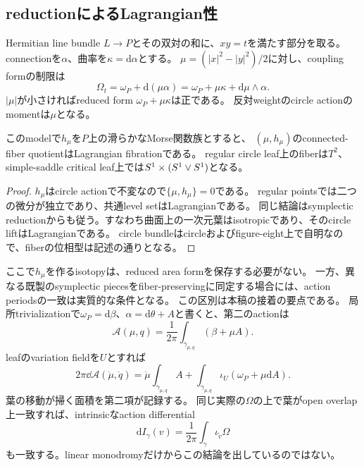 \subsection{reductionによるLagrangian性}
Hermitian line bundle $L\to P$とその双対の和に、$xy=t$を満たす部分を取る。
connectionを$\alpha$、曲率を$\kappa=\mathrm d\alpha$とする。
$\mu=(|x|^2-|y|^2)/2$に対し、coupling formの制限は
\begin{equation}\label{neck:form}
\Omega_t=\omega_P+\mathrm d(\mu\alpha)
=\omega_P+\mu\kappa+\mathrm d\mu\wedge\alpha.
\end{equation}
$|\mu|$が小さければreduced form $\omega_P+\mu\kappa$は正である。
反対weightのcircle actionのmomentは$\mu$となる。

\begin{lemma}\label{neck:lift}
このmodelで$h_\mu$を$P$上の滑らかなMorse関数族とすると、
$(\mu,h_\mu)$のconnected-fiber quotientはLagrangian fibrationである。
regular circle leaf上のfiberは$T^2$、simple-saddle critical leaf上では$S^1\times(S^1\vee S^1)$となる。
\end{lemma}
\begin{proof}
$h_\mu$はcircle actionで不変なので$\{\mu,h_\mu\}=0$である。
regular pointsでは二つの微分が独立であり、共通level setはLagrangianである。
同じ結論はsymplectic reductionからも従う。すなわち曲面上の一次元葉はisotropicであり、そのcircle liftはLagrangianである。
circle bundleはcircleおよびfigure-eight上で自明なので、fiberの位相型は記述の通りとなる。
\end{proof}

ここで$h_\mu$を作るisotopyは、reduced area formを保存する必要がない。
一方、異なる既製のsymplectic piecesをfiber-preservingに同定する場合には、action periodsの一致は実質的な条件となる。
この区別は本稿の接着の要点である。
局所trivializationで$\omega_P=\mathrm d\beta$、$\alpha=\mathrm d\theta+A$と書くと、第二のactionは
\[
\mathcal A(\mu,q)=\frac{1}{2\pi}\int_{\gamma_{\mu,q}}(\beta+\mu A).
\]
leafのvariation fieldを$U$とすれば
\begin{equation}\label{neck:action-variation}
2\pi\dd\mathcal A(\dot\mu,\dot q)
=\dot\mu\int_{\gamma_{\mu,q}}A
+\int_{\gamma_{\mu,q}}\iota_U(\omega_P+\mu\mathrm dA).
\end{equation}
葉の移動が掃く面積を第二項が記録する。
同じ実際の$\Omega$の上で葉がopen overlap上一致すれば、intrinsicなaction differential
\[
\mathrm dI_\gamma(v)=\frac1{2\pi}\int_{\gamma}\iota_{\widetilde v}\Omega
\]
も一致する。linear monodromyだけからこの結論を出しているのではない。

